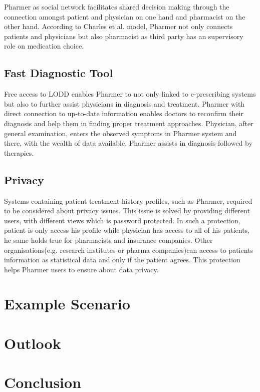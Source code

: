 \documentclass[journal]{IEEEtran}
\begin{document}
Pharmer as social network facilitates shared decision making through the connection amongst patient and physician on one hand and pharmacist on the other hand. According to Charles et al. model, Pharmer not only connects patients and physicians but also pharmacist as third party has an supervisory role on medication choice.

\subsection{Fast Diagnostic Tool}

Free access to LODD enables Pharmer to not only linked to e-prescribing systems but also to further assist physicians in diagnosis and treatment. Pharmer with direct connection to up-to-date information enables doctors to reconfirm their diagnosis and help them in finding proper treatment approaches. Physician, after general examination, enters the observed symptoms in Pharmer system and there, with the wealth of data available, Pharmer assists in diagnosis followed by therapies.

\subsection{Privacy}
 Systems containing patient treatment history profiles, such as Pharmer, required to be considered about privacy issues. This issue is solved by providing different users, with different views which is password protected. In such a protection, patient is only access his profile while physician has access to all of his patients, he same holds true for pharmacists and insurance companies. Other organisations(e.g. research institutes or pharma companies)can access to patients information as statistical data and only if the patient agrees. This protection helps Pharmer users to ensure about data privacy.

\section{Example Scenario}
\label{es}

\section{Outlook}
\label{outlook}

\section{Conclusion}
\label{sec:conclusion}

\begin{spacing}{0.3}


\end{spacing}

\end{document}
